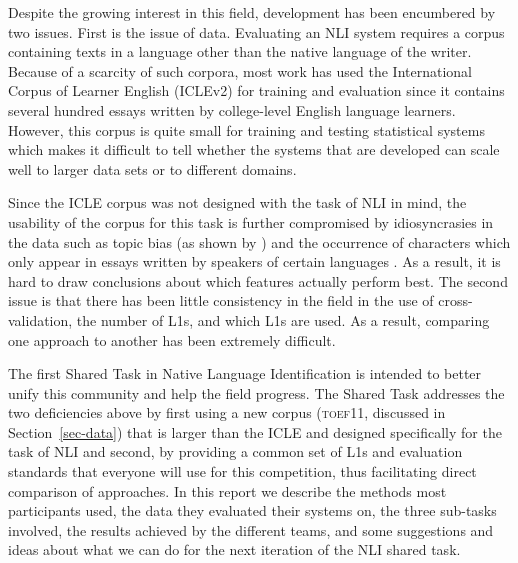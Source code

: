 \documentclass[11pt,letterpaper]{article}
\begin{document}
Despite the growing interest in this field, development has been encumbered
by two issues. First is the issue of data. Evaluating an NLI system requires
 a corpus containing texts in a language other than the native language of
the writer. Because of a scarcity of such corpora, most work has used
the International Corpus of Learner English (ICLEv2) \cite{Granger2009}
for training and evaluation since it contains several hundred essays
written by college-level English language learners. However,
this corpus is quite small for training and testing statistical systems
which makes it difficult to tell whether the systems that are developed can
scale well to larger data sets or to different domains.

Since the ICLE corpus was not designed with the task of NLI in mind, the
usability of the corpus for this task is further compromised by idiosyncrasies
in the data such as topic bias (as shown by ) and the
occurrence of characters which only appear in essays written by speakers of
certain languages \cite{tetreault-EtAl:2012:PAPERS}. As a result, it is hard to
draw conclusions about which features actually perform best. The second issue is
that there has been little consistency in the field in the use of
cross-validation, the number of L1s, and which L1s are used. As a result,
comparing one approach to another has been extremely difficult.

The first Shared Task in Native Language Identification is intended to
better unify this community and help the field progress. The Shared Task
addresses the two deficiencies above by first using a new corpus (\textsc{toef11},
discussed in Section~\ref{sec-data}) that is larger than the ICLE and designed specifically for the
task of NLI and second, by providing a common set of L1s and evaluation
standards that everyone will use for this competition, thus facilitating direct
comparison of approaches. In this report we describe the methods most
participants used, the data they evaluated their systems on, the three sub-tasks
involved, the results achieved by the different teams, and some suggestions and
ideas about what we can do for the next iteration of the NLI shared task.
\end{document}
